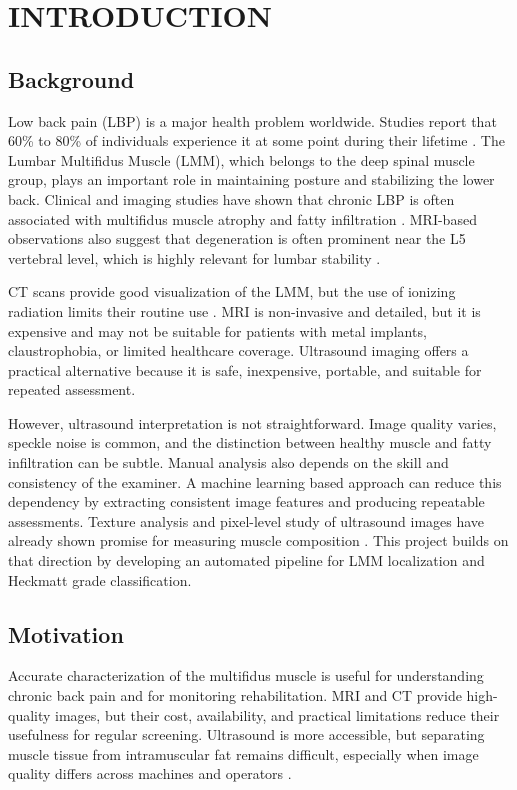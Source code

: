 \chapter{INTRODUCTION}

\section{Background}
\label{intro}
Low back pain (LBP) is a major health problem worldwide. Studies report that 60\% to 80\% of individuals experience it at some point during their lifetime \cite{Freeman2010}. The Lumbar Multifidus Muscle (LMM), which belongs to the deep spinal muscle group, plays an important role in maintaining posture and stabilizing the lower back. Clinical and imaging studies have shown that chronic LBP is often associated with multifidus muscle atrophy and fatty infiltration \cite{Vohra2016}. MRI-based observations also suggest that degeneration is often prominent near the L5 vertebral level, which is highly relevant for lumbar stability \cite{Vohra2016}.

CT scans provide good visualization of the LMM, but the use of ionizing radiation limits their routine use \cite{Brenner2022}. MRI is non-invasive and detailed, but it is expensive and may not be suitable for patients with metal implants, claustrophobia, or limited healthcare coverage. Ultrasound imaging offers a practical alternative because it is safe, inexpensive, portable, and suitable for repeated assessment.

However, ultrasound interpretation is not straightforward. Image quality varies, speckle noise is common, and the distinction between healthy muscle and fatty infiltration can be subtle. Manual analysis also depends on the skill and consistency of the examiner. A machine learning based approach can reduce this dependency by extracting consistent image features and producing repeatable assessments. Texture analysis and pixel-level study of ultrasound images have already shown promise for measuring muscle composition \cite{Pincheira2024}. This project builds on that direction by developing an automated pipeline for LMM localization and Heckmatt grade classification.

\section{Motivation}
\label{motivation}
Accurate characterization of the multifidus muscle is useful for understanding chronic back pain and for monitoring rehabilitation. MRI and CT provide high-quality images, but their cost, availability, and practical limitations reduce their usefulness for regular screening. Ultrasound is more accessible, but separating muscle tissue from intramuscular fat remains difficult, especially when image quality differs across machines and operators \cite{Sions2017}.

